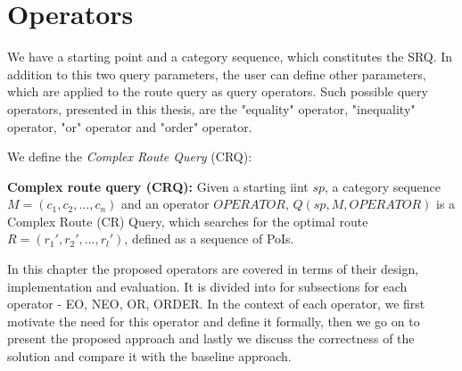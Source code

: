 \chapter{Operators} 
\label{sec:operators}

We have a starting point and a category sequence, which constitutes the SRQ. In addition to this two query parameters, the user can define other parameters, which are applied to the route query as query operators. Such possible query operators, presented in this thesis, are the "equality" operator, "inequality" operator, "or" operator and "order" operator. 

We define the \textit{Complex Route Query} (CRQ):

\textbf{Complex route query (CRQ):} Given a starting iint $sp$, a category sequence $M = (c_1, c_2, ..., c_n)$ and an operator $OPERATOR$, $Q(sp, M, OPERATOR)$ is a Complex Route (CR) Query, which searches for the optimal route $R = (r_1', r_2', ..., r_l')$, defined as a sequence of PoIs.

In this chapter the proposed operators are covered in terms of their design, implementation and evaluation. It is divided into for subsections for each operator - EO, NEO, OR, ORDER. In the context of each operator, we first motivate the need for this operator and define it formally, then we go on to present the proposed approach and lastly we discuss the correctness of the solution and compare it with the baseline approach.